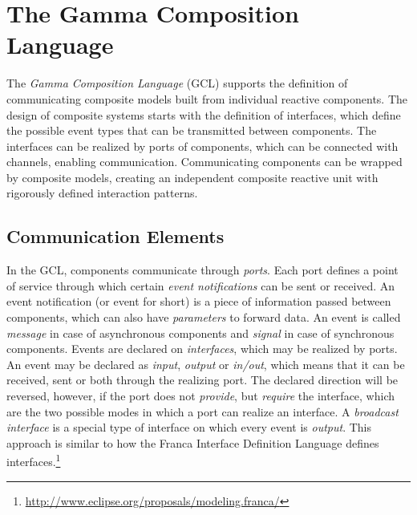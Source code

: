 %
%

\section{The Gamma Composition Language}
\label{sec:composition-language}
The \emph{Gamma Composition Language} (GCL) supports the definition of communicating composite models
built from individual reactive components. The design of composite systems starts with the definition of interfaces, which define the possible event types that can be transmitted between components. The interfaces can be realized by ports of components, which can be connected with channels, enabling communication. Communicating components can be wrapped by composite models, creating an independent composite reactive unit with rigorously defined interaction patterns.

\subsection{Communication Elements}
\label{sec:communication-elements}

In the GCL, components communicate through \emph{ports}. Each port defines a point of service through which certain \emph{event notifications} can be sent or received. An event notification (or event for short) is a piece of information passed between components, which can also have \emph{parameters} to forward data. An event is called \emph{message} in case of asynchronous components and \emph{signal} in case of synchronous components. Events are declared on \emph{interfaces}, which may be realized by ports. An event may be declared as \emph{input}, \emph{output} or \emph{in/out}, which means that it can be received, sent or both through the realizing port. The declared direction will be reversed, however, if the port does not \emph{provide}, but \emph{require} the interface, which are the two possible modes in which a port can realize an interface. A \emph{broadcast interface} is a special type of interface on which every event is \emph{output}. This approach is similar to how the Franca Interface Definition Language defines interfaces.\footnote{\url{http://www.eclipse.org/proposals/modeling.franca/}}

